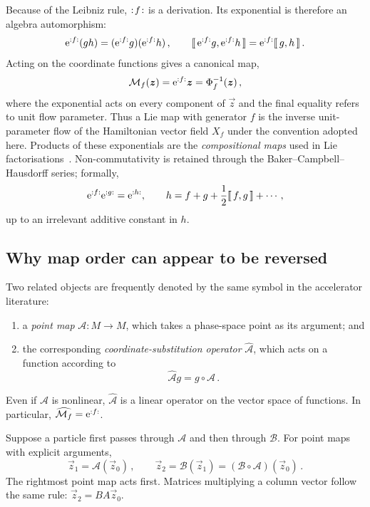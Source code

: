 Because of the Leibniz rule, ${:\!{f}\!:}$ is a derivation.  Its exponential is
therefore an algebra automorphism:
\begin{equation}
    \mathrm{e}^{{:{f}:}}(gh) = (\mathrm{e}^{{:{f}:}}g)(\mathrm{e}^{{:{f}:}}h)\,,
    \qquad
    \llbracket \, \mathrm{e}^{{:{f}:}}g,\mathrm{e}^{{:{f}:}}h\,\rrbracket = \mathrm{e}^{{:{f}:}}\llbracket \, g,h\,\rrbracket\,.
\end{equation}
Acting on the coordinate functions gives a canonical map,
\begin{equation}
    \mathcal{M}_f(\bm{z}) = \mathrm{e}^{{:{f}:}}\bm{z} = \Phi_f^{-1}(\bm{z})\,,
\end{equation}
where the exponential acts on every component of $\vec z$ and the final
equality refers to unit flow parameter.  Thus a Lie map with generator $f$
is the inverse unit-parameter flow of the Hamiltonian vector field $X_f$ under
the convention adopted here.  Products of
these exponentials are the \emph{compositional maps} used in Lie
factorisations~\cite{DragtFinn1976,DragtForest1983}.  Non-commutativity is
retained through the Baker--Campbell--Hausdorff series; formally,
\begin{equation}
    \mathrm{e}^{{:{f}:}}\mathrm{e}^{{:{g}:}} = \mathrm{e}^{{:{h}:}},\qquad
    h = f + g + \frac{1}{2}\llbracket \, f,g\,\rrbracket + \cdots\,,
\end{equation}
up to an irrelevant additive constant in $h$.


\subsection{Why map order can appear to be reversed}

Two related objects are frequently denoted by the same symbol in the
accelerator literature:
\begin{enumerate}
 \item a \emph{point map} $\mathcal{A}:M\to M$, which takes a phase-space
       point as its argument; and
 \item the corresponding \emph{coordinate-substitution operator}
       $\widehat{\mathcal{A}}$, which acts on a function according to
       \begin{equation}
    \widehat{\mathcal{A}}g = g\circ\mathcal{A}\,.
\end{equation}
\end{enumerate}
Even if $\mathcal{A}$ is nonlinear, $\widehat{\mathcal{A}}$ is a linear
operator on the vector space of functions.  In particular,
$\widehat{\mathcal{M}_f} = \mathrm{e}^{{:{f}:}}$.

Suppose a particle first passes through $\mathcal{A}$ and then through
$\mathcal{B}$.  For point maps with explicit arguments,
\begin{equation}\label{eq:point-map-order}
    \vec z_1 = \mathcal{A}(\vec z_0)\,,\qquad
    \vec z_2 = \mathcal{B}(\vec z_1)
             = \left(\mathcal{B}\circ\mathcal{A}\right)(\vec z_0)\,.
\end{equation}
The rightmost point map acts first.  Matrices multiplying a column vector
follow the same rule: $\vec z_2 = BA\vec z_0$.

